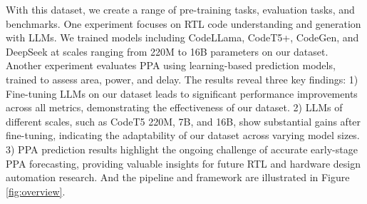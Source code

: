 With this dataset, we create a range of pre-training tasks, evaluation tasks, and benchmarks. One experiment focuses on RTL code understanding and generation with LLMs. We trained models including CodeLLama\cite{codellama}, CodeT5+\cite{codet5}, CodeGen\cite{codegen}, and DeepSeek\cite{liu2024deepseekv2, zhu2024deepseekcoderv2} at scales ranging from 220M to 16B parameters on our dataset. Another experiment evaluates PPA using learning-based prediction models\cite{xu2022sns,sengupta2022good,fang2023masterrtl}, trained to assess area, power, and delay. The results reveal three key findings:
1) Fine-tuning LLMs on our dataset leads to significant performance improvements across all metrics, demonstrating the effectiveness of our dataset.
2) LLMs of different scales, such as CodeT5 220M, 7B, and 16B, show substantial gains after fine-tuning, indicating the adaptability of our dataset across varying model sizes.
3) PPA prediction results highlight the ongoing challenge of accurate early-stage PPA forecasting, providing valuable insights for future RTL and hardware design automation research.
And the pipeline and framework are illustrated in Figure \ref{fig:overview}.


